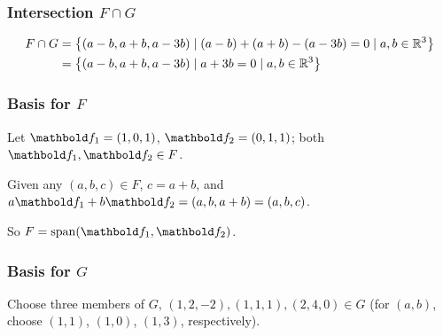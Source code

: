 \documentclass[11pt]{article}
\begin{document}
\begin{enumerate}
          \subsubsection*{Intersection $F \cap G$}
          \[
              \begin{aligned}
                  F \cap G
                   & = \left\{
                      (a - b, a + b, a - 3b)
                      \mid (a - b) + (a + b) - (a - 3b) = 0
                      \mid a, b \in \mathbb{R}^3
                  \right\}
                  \\
                   & = \left\{
                      (a - b, a + b, a - 3b)
                      \mid a + 3b = 0
                      \mid a, b \in \mathbb{R}^3
                  \right\}
              \end{aligned}
          \]

          \subsubsection*{Basis for $F$}

          Let $\vect{f}_1 = (1, 0, 1)$, $\vect{f}_2 = (0, 1, 1)$; both $\vect{f}_1,\vect{f}_2 \in F$.

          Given any $(a, b, c) \in F$, $c = a + b$, and $a \vect{f}_1 + b \vect{f}_2 = (a, b, a + b) = (a, b, c)$.

          So $F = \Span ( \vect{f}_1, \vect{f}_2 )$.

          \subsubsection*{Basis for $G$}

          Choose three members of $G$, $(1, 2, -2), (1, 1, 1), (2, 4, 0) \in G$ (for $(a, b)$, choose $(1, 1)$, $(1, 0)$,
          $(1, 3)$, respectively).


\end{enumerate}
\end{document}
